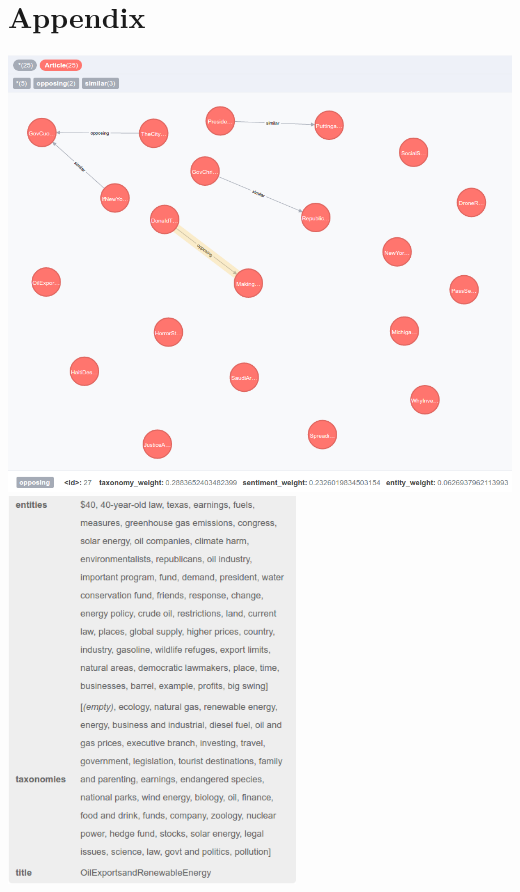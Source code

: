 \documentclass[12pt]{article}
\begin{document}
\section{Appendix}
\includegraphics[width=5.75in]{graph_screenshot}
\includegraphics[width=3in]{graph_node_screenshot}
\end{document}
